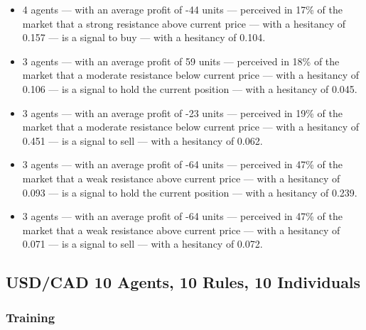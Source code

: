 {\small
  \begin{itemize}
  \item 4 agents — with an average profit of -44 units — perceived in 17\% of
    the market that a strong resistance above current price — with a hesitancy
    of 0.157 — is a signal to buy — with a hesitancy of 0.104.
  \item 3 agents — with an average profit of 59 units — perceived in 18\% of the
    market that a moderate resistance below current price — with a hesitancy of
    0.106 — is a signal to hold the current position — with a hesitancy of
    0.045.
  \item 3 agents — with an average profit of -23 units — perceived in 19\% of
    the market that a moderate resistance below current price — with a hesitancy
    of 0.451 — is a signal to sell — with a hesitancy of 0.062.
  \item 3 agents — with an average profit of -64 units — perceived in 47\% of
    the market that a weak resistance above current price — with a hesitancy of
    0.093 — is a signal to hold the current position — with a hesitancy of
    0.239.
  \item 3 agents — with an average profit of -64 units — perceived in 47\% of
    the market that a weak resistance above current price — with a hesitancy of
    0.071 — is a signal to sell — with a hesitancy of 0.072.
  \end{itemize}
}

\subsection{USD/CAD 10 Agents, 10 Rules, 10 Individuals}
\label{results:interpretation-usd-cad-10agents-10rules-10individuals}

\subsubsection{Training}

